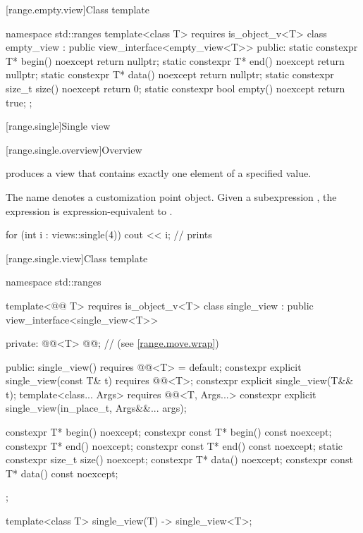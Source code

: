 [range.empty.view]{Class template }

%
\begin{codeblock}
namespace std::ranges {
  template<class T>
    requires is_object_v<T>
  class empty_view : public view_interface<empty_view<T>> {
  public:
    static constexpr T* begin() noexcept { return nullptr; }
    static constexpr T* end() noexcept { return nullptr; }
    static constexpr T* data() noexcept { return nullptr; }
    static constexpr size_t size() noexcept { return 0; }
    static constexpr bool empty() noexcept { return true; }
  };
}
\end{codeblock}

[range.single]{Single view}

[range.single.overview]{Overview}

\pnum
{} produces a view that contains
exactly one element of a specified value.

\pnum
{}%
The name  denotes a
customization point object.
Given a subexpression , the expression
 is expression-equivalent to
.

\pnum
\begin{example}
\begin{codeblock}
for (int i : views::single(4))
  cout << i;        // prints 
\end{codeblock}
\end{example}

[range.single.view]{Class template }

%
\begin{codeblock}
namespace std::ranges {
  template<@@ T>
    requires is_object_v<T>
  class single_view : public view_interface<single_view<T>> {
  private:
    @@<T> @@;              // \expos{} (see \ref{range.move.wrap})

  public:
    single_view() requires @@<T> = default;
    constexpr explicit single_view(const T& t) requires @@<T>;
    constexpr explicit single_view(T&& t);
    template<class... Args>
      requires @@<T, Args...>
    constexpr explicit single_view(in_place_t, Args&&... args);

    constexpr T* begin() noexcept;
    constexpr const T* begin() const noexcept;
    constexpr T* end() noexcept;
    constexpr const T* end() const noexcept;
    static constexpr size_t size() noexcept;
    constexpr T* data() noexcept;
    constexpr const T* data() const noexcept;
  };

  template<class T>
    single_view(T) -> single_view<T>;
}
\end{codeblock}

